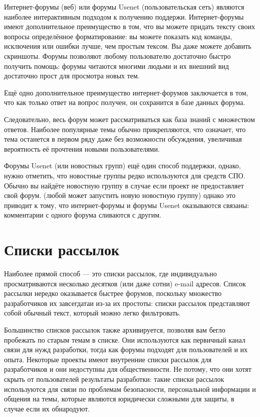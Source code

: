 \documentclass[10pt]{book}
\begin{document}
Интернет-форумы (веб) или форумы Usenet (пользовательская сеть) являются наиболее интерактивным подходом к получению поддержи. Интернет-форумы имеют дополнительное преимущество в том, что вы можете придать тексту своих вопросы определённое форматирование: вы можете показать код команды, исключения или ошибки лучше, чем простым тексом. Вы даже можете добавить скриншоты. Форумы позволяют любому пользователю достаточно быстро получить помощь: форумы читаются многими людьми и их внешний вид достаточно прост для просмотра новых тем. 

Ещё одно дополнительное преимущество интернет-форумов заключается в том, что как только ответ на вопрос получен, он сохранится в базе данных форума.

Следовательно, весь форум может рассматриваться как база знаний с множеством ответов. Наиболее популярные темы обычно прикрепляются, что означает, что тема останется в первом ряду даже без возможности обсуждения, увеличивая вероятность её прочтения новыми пользователями.

Форумы Usenet (или новостных групп) ещё один способ поддержки, однако, нужно отметить, что новостные группы редко используются для средств СПО. Обычно вы найдёте новостную группу в случае если проект не предоставляет свой форум. (любой может запустить новую новостную группу) однако это приводит к тому, что интернет-форумы и форумы Usenet оказываются связаны: комментарии с одного форума сливаются с другим.

\section{Списки рассылок}

Наиболее прямой способ — это списки рассылок, где индивидуально просматриваются несколько десятков (или даже сотни) e-mail адресов. Список рассылки нередко оказывается быстрее форумов, поскольку множество разработчиков их завсегдатаи из-за их простоты: списки рассылок представляют собой обычный текст, который можно легко фильтровать.

Большинство списков рассылок также архивируется, позволяя вам бегло пробежать по старым темам в списке. Они используются как первичный канал связи для нужд разработки, тогда как форумы подходят для пользователей и их опыта. Некоторые проекты имеют внутренние списки рассылок для разработчиков и они недоступны для общественности. Не потому, что они хотят скрыть от пользователей результаты разработки: такие списки рассылок используются для связи по проблемам безопасности, персональной информации и общения на темы, которые являются юридически сложными для защиты, в случае если их обнародуют.
\end{document}
